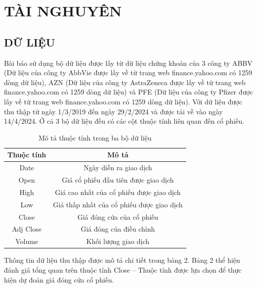 \documentclass[conference]{IEEEtran}
\begin{document}
\section{TÀI NGHUYÊN}
\subsection{DỮ LIỆU}
Bài báo sử dụng bộ dữ liệu được lấy từ dữ liệu chứng khoán của 3 công ty ABBV (Dữ liệu của công ty AbbVie được lấy về từ trang web finance.yahoo.com có 1259 dòng dữ liệu), AZN (Dữ liệu của công ty AstraZeneca được lấy về từ trang web finance.yahoo.com có 1259 dòng dữ liệu) và PFE (Dữ liệu của công ty Pfizer được lấy về từ trang web finance.yahoo.com có 1259 dòng dữ liệu). Với dữ liệu được thu thập từ ngày 1/3/2019 đến ngày 29/2/2024 và được tải về vào ngày 14/4/2024. Ở cả 3 bộ dữ liệu đều có các cột thuộc tính liên quan đến cổ phiếu.

\begin{table}[H]
  \centering
  \caption{Mô tả thuộc tính trong ba bộ dữ liệu}
\begin{tabular}{|>{\columncolor{red!20}}c|c|}
    \hline
     \rowcolor{red!20} Thuộc tính & Mô tả\\ \hline
     Date & Ngày diễn ra giao dịch \\ \hline
     Open & Giá cổ phiếu đầu tiên được giao dịch\\ \hline
     High & Giá cao nhất của cổ phiếu được giao dịch\\ \hline
     Low & Giá thấp nhất của cổ phiếu được giao dịch\\ \hline
     Close & Giá đóng cửa của cổ phiếu\\ \hline
     Adj Close & Giá đóng của điều chỉnh\\ \hline
     Volume & Khối lượng giao dịch\\ \hline
\end{tabular}
\end{table}

Thông tin dữ liệu thu thập được mô tả chi tiết trong bảng 2. Bảng 2 thể hiện đánh giá tổng quan trên thuộc tính Close – Thuộc tính được lựa chọn để thực hiện dự đoán giá đóng cửa cổ phiếu.
\end{document}
